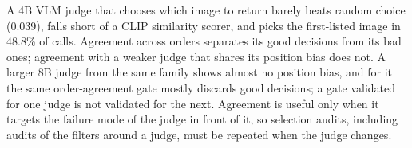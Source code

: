 A 4B VLM judge that chooses which image to return barely beats random choice (0.039), falls short of a CLIP similarity scorer, and picks the first-listed image in 48.8\% of calls. Agreement across orders separates its good decisions from its bad ones; agreement with a weaker judge that shares its position bias does not. A larger 8B judge from the same family shows almost no position bias, and for it the same order-agreement gate mostly discards good decisions; a gate validated for one judge is not validated for the next. Agreement is useful only when it targets the failure mode of the judge in front of it, so selection audits, including audits of the filters around a judge, must be repeated when the judge changes.
